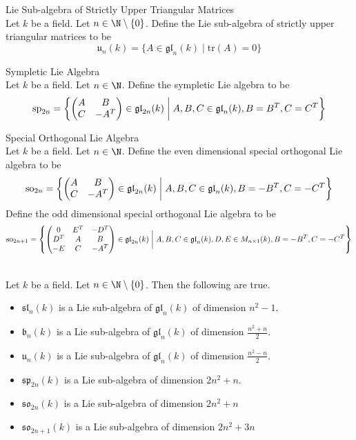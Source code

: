 \documentclass[a4paper]{article}
\begin{document}
\begin{defn}{Lie Sub-algebra of Strictly Upper Triangular Matrices}{} \\Let $k$ be a field. Let $n\in\N\setminus\{0\}$. Define the Lie sub-algebra of strictly upper triangular matrices to be $$\mathfrak{u}_n(k)=\{A\in\mathfrak{gl}_n(k)\;|\;\text{tr}(A)=0\}$$
\end{defn}

\begin{defn}{Sympletic Lie Algebra}{} \\Let $k$ be a field. Let $n\in\N$. Define the sympletic Lie algebra to be $$\text{sp}_{2n}=\left\{
\begin{pmatrix}
A & B\\
C & -A^T
\end{pmatrix}\in\mathfrak{gl}_{2n}(k)\;\bigg{|}\;A,B,C\in\mathfrak{gl}_n(k), B=B^T, C=C^T\right\}$$
\end{defn}

\begin{defn}{Special Orthogonal Lie Algebra}{} \\Let $k$ be a field. Let $n\in\N$. Define the even dimensional special orthogonal Lie algebra to be $$\text{so}_{2n}=\left\{
\begin{pmatrix}
A & B\\
C & -A^T
\end{pmatrix}\in\mathfrak{gl}_{2n}(k)\;\bigg{|}\;A,B,C\in\mathfrak{gl}_n(k), B=-B^T, C=-C^T\right\}$$ Define the odd dimensional special orthogonal Lie algebra to be $$\text{so}_{2n+1}=\left\{
\begin{pmatrix}
0 & E^T & -D^T\\
D^T & A & B\\
-E & C & -A^T
\end{pmatrix}\in\mathfrak{gl}_{2n}(k)\;\bigg{|}\;A,B,C\in\mathfrak{gl}_n(k), D,E\in M_{n\times 1}(k), B=-B^T, C=-C^T\right\}$$
\end{defn}

\begin{prp}{}{} \\Let $k$ be a field. Let $n\in\N\setminus\{0\}$. Then the following are true. 
\begin{itemize}
\item $\mathfrak{sl}_n(k)$ is a Lie sub-algebra of $\mathfrak{gl}_n(k)$ of dimension $n^2-1$. 
\item $\mathfrak{b}_n(k)$ is a Lie sub-algebra of $\mathfrak{gl}_n(k)$ of dimension $\frac{n^2+n}{2}$. 
\item $\mathfrak{u}_n(k)$ is a Lie sub-algebra of $\mathfrak{gl}_n(k)$ of dimension $\frac{n^2-n}{2}$. 
\item $\mathfrak{sp}_{2n}(k)$ is a Lie sub-algebra of dimension $2n^2+n$. 
\item $\mathfrak{so}_{2n}(k)$ is a Lie sub-algebra of dimension $2n^2+n$
\item $\mathfrak{so}_{2n+1}(k)$ is a Lie sub-algebra of dimension $2n^2+3n$
\end{itemize}
\end{prp}
\end{document}
